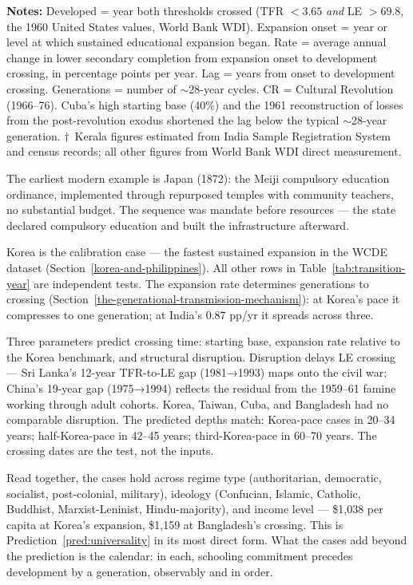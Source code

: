 \documentclass[12pt,letterpaper]{article}
\begin{document}
\begin{minipage}{\dimexpr\textwidth-2em}
\scriptsize
\textbf{Notes:} Developed = year both thresholds crossed (TFR
$<3.65$ \emph{and} LE $>69.8$, the 1960 United States values, World
Bank WDI). Expansion onset = year or level at which sustained
educational expansion began. Rate = average annual change in lower
secondary completion from expansion onset to development crossing,
in percentage points per year. Lag = years from onset to development
crossing. Generations = number of $\sim$28-year cycles. CR = Cultural Revolution (1966--76). Cuba's high
starting base (40\%) and the 1961 reconstruction of losses from the
post-revolution exodus shortened the lag below the typical
$\sim$28-year generation. $\dagger$~Kerala figures estimated from
India Sample Registration System and census records; all other
figures from World Bank WDI direct measurement.
\end{minipage}

The earliest modern example is Japan (1872): the Meiji compulsory
education ordinance, implemented through repurposed temples with
community teachers, no substantial budget. The sequence was mandate
before resources --- the state declared compulsory education and built
the infrastructure afterward.

Korea is the calibration case --- the fastest sustained expansion in
the WCDE dataset (Section~\ref{korea-and-philippines}). All other rows in
Table~\ref{tab:transition-year} are independent tests. The expansion rate determines
generations to crossing
(Section~\ref{the-generational-transmission-mechanism}): at Korea's
pace it compresses to one generation; at India's 0.87 pp/yr it spreads
across three.

Three parameters predict crossing time: starting base, expansion rate
relative to the Korea benchmark, and structural disruption. Disruption
delays LE crossing --- Sri Lanka's 12-year TFR-to-LE gap (1981→1993)
maps onto the civil war; China's 19-year gap (1975→1994) reflects
the residual from the 1959--61 famine working through adult cohorts. Korea, Taiwan, Cuba,
and Bangladesh had no comparable disruption. The predicted depths match:
Korea-pace cases in 20--34 years; half-Korea-pace in 42--45 years;
third-Korea-pace in 60--70 years. The crossing dates are the test, not
the inputs.

Read together, the cases hold across regime type (authoritarian,
democratic, socialist, post-colonial, military), ideology (Confucian,
Islamic, Catholic, Buddhist, Marxist-Leninist, Hindu-majority), and
income level --- \$1,038 per capita at Korea's expansion, \$1,159 at
Bangladesh's crossing. This is Prediction~\ref{pred:universality} in
its most direct form. What the cases add beyond the prediction is the
calendar: in each, schooling commitment precedes development by a
generation, observably and in order.
\end{document}
